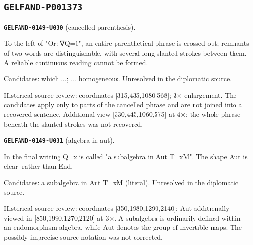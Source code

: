 \documentclass[11pt]{article}
\theoremstyle{definition}
\theoremstyle{remark}
\begin{document}
\subsection*{\texttt{GELFAND-P001373}}
\noindent\leavevmode{}\label{GELFAND-P001373:cancelled-parenthesis:note}\textbf{\texttt{GELFAND-0149-U030}} (cancelled-parenthesis).\par\nopagebreak[4]
To the left of "Or: ∇Q=0", an entire parenthetical phrase is crossed out; remnants of two words are distinguishable, with several long slanted strokes between them. A reliable continuous reading cannot be formed.\par
Candidates: which ...; ... homogeneous. Unresolved in the diplomatic source.\par
Historical source review: coordinates [315,435,1080,568]; 3× enlargement. The candidates apply only to parts of the cancelled phrase and are not joined into a recovered sentence. Additional view [330,445,1060,575] at 4×; the whole phrase beneath the slanted strokes was not recovered.\par\medskip
\noindent\leavevmode{}\label{GELFAND-P001373:algebra-in-aut:note}\textbf{\texttt{GELFAND-0149-U031}} (algebra-in-aut).\par\nopagebreak[4]
In the final writing Q\_x is called "a subalgebra in Aut T\_xM". The shape Aut is clear, rather than End.\par
Candidates: a subalgebra in Aut T\_xM (literal). Unresolved in the diplomatic source.\par
Historical source review: coordinates [350,1980,1290,2140]; Aut additionally viewed in [850,1990,1270,2120] at 3×. A subalgebra is ordinarily defined within an endomorphism algebra, while Aut denotes the group of invertible maps. The possibly imprecise source notation was not corrected.\par\medskip
\end{document}

